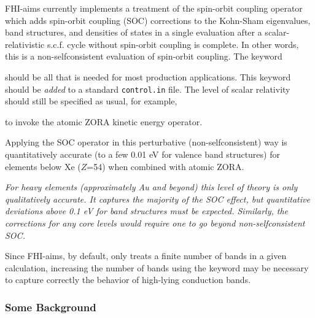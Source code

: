 FHI-aims currently implements a treatment of the spin-orbit coupling
operator which adds spin-orbit coupling (SOC) corrections to the Kohn-Sham
eigenvalues, band structures, and densities of states in a
single evaluation after a scalar-relativistic s.c.f. cycle without
spin-orbit coupling is complete. In other words, this is a
non-selfconsistent evaluation of spin-orbit coupling. The keyword 

   

should be all that is needed for most production applications. This keyword
should be \emph{added} to a standard \texttt{control.in} file.
The level of scalar relativity should still be specified as usual, for
example, 

    

to invoke the atomic ZORA kinetic energy operator.

Applying the SOC operator in this perturbative
(non-selfconsistent) way is quantitatively accurate (to a few 0.01 eV
for valence band structures) for elements below Xe ($Z$=54) when
combined with atomic ZORA.

\emph{For heavy
  elements (approximately Au and beyond) this level of theory is only
  qualitatively accurate. It captures the majority of the SOC effect,
  but quantitative deviations above 0.1 eV for band structures must be
  expected. Similarly, the corrections for any core levels would
  require one to go beyond non-selfconsistent SOC.}

Since FHI-aims, by default, only treats a finite number of bands in a
given calculation, increasing the number of bands using the keyword
 may be necessary to capture correctly the
behavior of high-lying conduction bands.

\subsubsection{Some Background}

